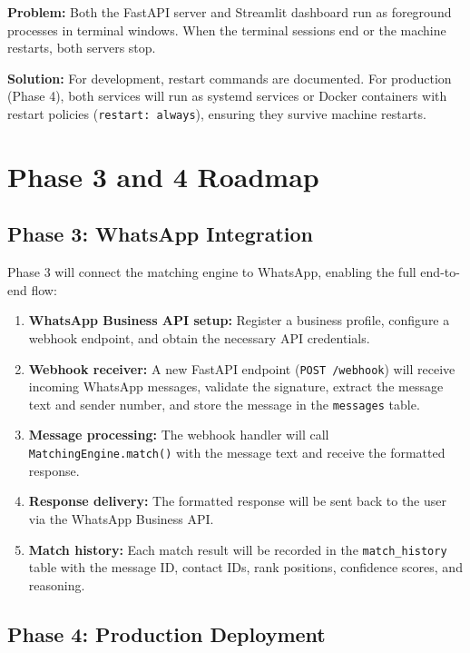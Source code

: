 \documentclass[12pt, a4paper]{report}
\begin{document}
\textbf{Problem:} Both the FastAPI server and Streamlit dashboard run as foreground processes in terminal windows. When the terminal sessions end or the machine restarts, both servers stop.

\textbf{Solution:} For development, restart commands are documented. For production (Phase 4), both services will run as systemd services or Docker containers with restart policies (\texttt{restart: always}), ensuring they survive machine restarts.

\chapter{Phase 3 and 4 Roadmap}

\section{Phase 3: WhatsApp Integration}

Phase 3 will connect the matching engine to WhatsApp, enabling the full end-to-end flow:

\begin{enumerate}[itemsep=3pt]
    \item \textbf{WhatsApp Business API setup:} Register a business profile, configure a webhook endpoint, and obtain the necessary API credentials.
    \item \textbf{Webhook receiver:} A new FastAPI endpoint (\texttt{POST /webhook}) will receive incoming WhatsApp messages, validate the signature, extract the message text and sender number, and store the message in the \texttt{messages} table.
    \item \textbf{Message processing:} The webhook handler will call \texttt{MatchingEngine.match()} with the message text and receive the formatted response.
    \item \textbf{Response delivery:} The formatted response will be sent back to the user via the WhatsApp Business API.
    \item \textbf{Match history:} Each match result will be recorded in the \texttt{match\_history} table with the message ID, contact IDs, rank positions, confidence scores, and reasoning.
\end{enumerate}

\section{Phase 4: Production Deployment}
\end{document}
